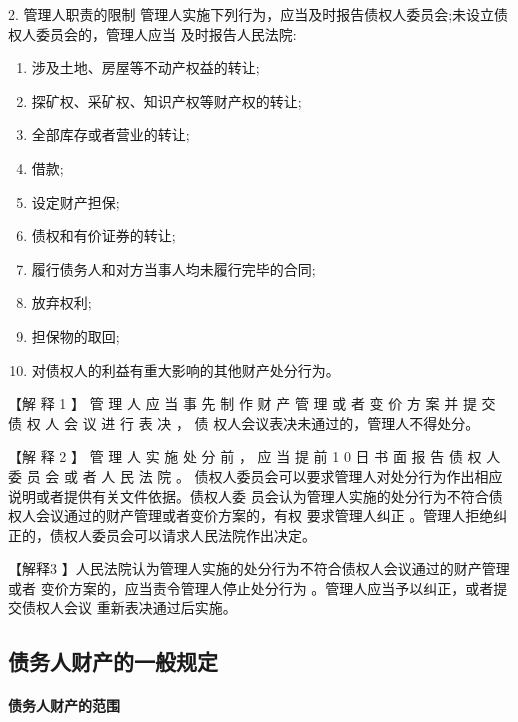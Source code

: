 \documentclass[UTF8,12pt]{ctexart}
\numberwithin{equation}{section} %
\numberwithin{figure}{section}
\numberwithin{table}{section}
\begin{document}
	2. 管理人职责的限制 管理人实施下列行为，应当及时报告债权人委员会;未设立债权人委员会的，管理人应当 及时报告人民法院:
	\begin{enumerate}
		\item 涉及土地、房屋等不动产权益的转让;
		
		\item 探矿权、采矿权、知识产权等财产权的转让;
		
		\item 全部库存或者营业的转让;
		
		\item 借款;
		
		\item 设定财产担保;
		
		\item 债权和有价证券的转让;
		
		\item 履行债务人和对方当事人均未履行完毕的合同;
		
		\item 放弃权利;
		
		\item 担保物的取回;
		
		\item 对债权人的利益有重大影响的其他财产处分行为。
	\end{enumerate}
	
	【解 释 1 】 管 理 人 应 当 事 先 制 作 财 产 管 理 或 者 变 价 方 案 并 提 交 债 权 人 会 议 进 行 表 决 ， 债 权人会议表决未通过的，管理人不得处分。
	
	【解 释 2 】 管 理 人 实 施 处 分 前 ， 应 当 提 前 1 0 日 书 面 报 告 债 权 人 委 员 会 或 者 人 民 法 院 。 债权人委员会可以要求管理人对处分行为作出相应说明或者提供有关文件依据。债权人委 员会认为管理人实施的处分行为不符合债权人会议通过的财产管理或者变价方案的，有权 要求管理人纠正 。管理人拒绝纠正的，债权人委员会可以请求人民法院作出决定。 
	
	【解释3 】人民法院认为管理人实施的处分行为不符合债权人会议通过的财产管理或者 变价方案的，应当责令管理人停止处分行为 。管理人应当予以纠正，或者提交债权人会议 重新表决通过后实施。
	
	
	\subsection{债务人财产的一般规定}
	\paragraph{债务人财产的范围}
	
\end{document}
